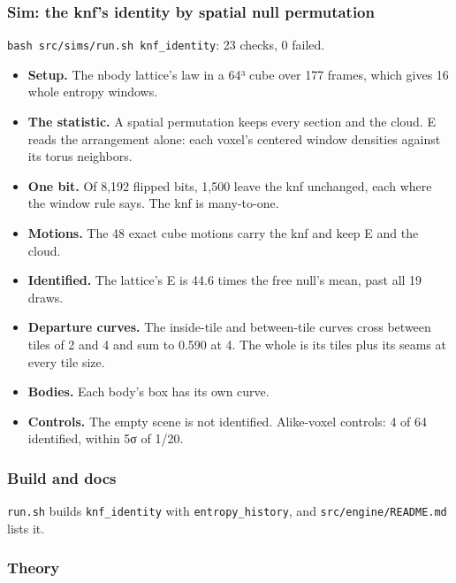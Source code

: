 \subsubsection{\texorpdfstring{Sim: the knf's identity by spatial null permutation}{Sim: the knf's identity by spatial null permutation}}

\texttt{bash src/\allowbreak{}sims/\allowbreak{}run.\allowbreak{}sh knf\_\allowbreak{}identity}: 23 checks, 0 failed.

\begin{itemize}
\item \textbf{Setup.} The nbody lattice's law in a 64³ cube over 177 frames, which gives 16 whole entropy windows.
\item \textbf{The statistic.} A spatial permutation keeps every section and the cloud. E reads the arrangement alone: each voxel's centered window densities against its torus neighbors.
\item \textbf{One bit.} Of 8,192 flipped bits, 1,500 leave the knf unchanged, each where the window rule says. The knf is many-to-one.
\item \textbf{Motions.} The 48 exact cube motions carry the knf and keep E and the cloud.
\item \textbf{Identified.} The lattice's E is 44.6 times the free null's mean, past all 19 draws.
\item \textbf{Departure curves.} The inside-tile and between-tile curves cross between tiles of 2 and 4 and sum to 0.590 at 4. The whole is its tiles plus its seams at every tile size.
\item \textbf{Bodies.} Each body's box has its own curve.
\item \textbf{Controls.} The empty scene is not identified. Alike-voxel controls: 4 of 64 identified, within 5σ of 1/20.
\end{itemize}

\subsubsection{\texorpdfstring{Build and docs}{Build and docs}}

\texttt{run.\allowbreak{}sh} builds \texttt{knf\_\allowbreak{}identity} with \texttt{entropy\_\allowbreak{}history}, and \texttt{src/\allowbreak{}engine/\allowbreak{}README.\allowbreak{}md} lists it.

\subsubsection{\texorpdfstring{Theory}{Theory}}

